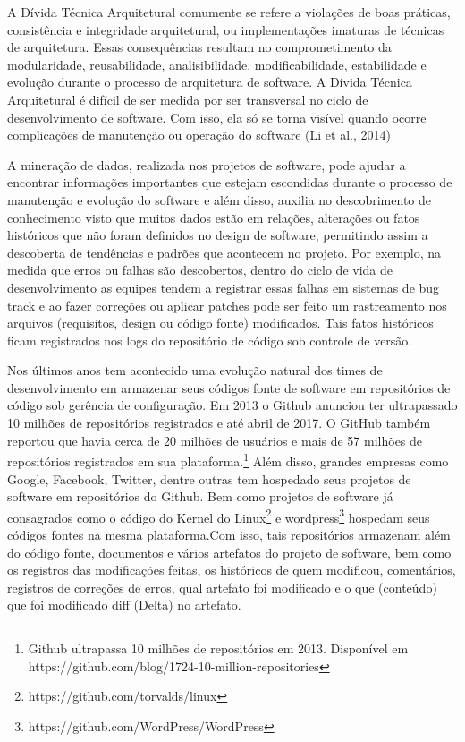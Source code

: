 \documentclass[
	12pt,				%
	openright,			%
	twoside,			%
	a4paper,			%
	english,			%
	french,				%
	spanish,			%
	brazil,				%
	]{abntex2}
\begin{document}
A Dívida Técnica Arquitetural comumente se refere a violações de boas
práticas, consistência e integridade
arquitetural, ou implementações imaturas de técnicas de arquitetura.
Essas consequências resultam no comprometimento da modularidade, reusabilidade,
analisibilidade, modificabilidade, estabilidade e evolução durante
o processo de arquitetura de software. A Dívida Técnica
Arquitetural é difícil de ser medida por ser transversal no ciclo
de desenvolvimento de software.  Com isso, ela
só se torna visível quando ocorre complicações de manutenção ou operação
do software (Li et al., 2014)

A mineração de dados, realizada nos projetos de software, pode ajudar
a encontrar informações importantes que estejam escondidas durante
o processo de manutenção e evolução do software e além disso, auxilia
no descobrimento de conhecimento visto que muitos dados estão em relações,
alterações ou fatos históricos que não foram definidos no design de
software, permitindo assim a descoberta de tendências e padrões que
acontecem no projeto. Por exemplo, na medida que erros ou falhas são
descobertos, dentro do ciclo de vida de desenvolvimento as equipes
tendem a registrar essas falhas em sistemas de bug track e ao fazer
correções ou aplicar patches pode ser feito um rastreamento nos arquivos
(requisitos, design ou código fonte) modificados. Tais fatos históricos
ficam registrados nos logs do repositório de código sob controle de
versão. 

Nos últimos anos tem acontecido uma evolução natural dos times de
desenvolvimento em armazenar seus códigos fonte de software em repositórios
de código sob gerência de configuração. Em 2013 o Github anunciou
ter ultrapassado 10 milhões de repositórios registrados e até abril
de 2017. O GitHub também reportou que havia cerca de 20 milhões de
usuários e mais de 57 milhões de repositórios registrados em sua plataforma.\footnote{Github ultrapassa 10 milhões de repositórios em 2013. Disponível em
https://github.com/blog/1724-10-million-repositories} Além disso, grandes empresas como Google, Facebook, Twitter, dentre
outras tem hospedado seus projetos de software em repositórios do
Github. Bem como projetos de software já consagrados como o código
do Kernel do Linux\footnote{https://github.com/torvalds/linux} e
wordpress\footnote{https://github.com/WordPress/WordPress } hospedam
seus códigos fontes na mesma plataforma.Com isso, tais repositórios
armazenam além do código fonte, documentos e vários artefatos do projeto
de software, bem como os registros das modificações feitas, os históricos
de quem modificou, comentários, registros de correções de erros, qual
artefato foi modificado e o que (conteúdo) que foi modificado diff
(Delta) no artefato. 
\end{document}
